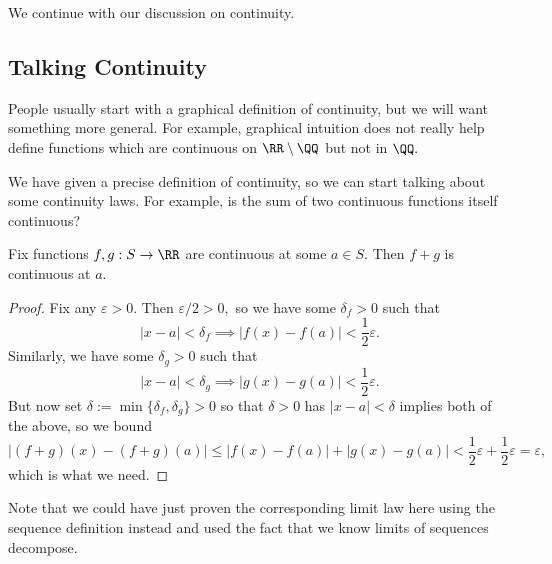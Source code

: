 \documentclass[../notes.tex]{subfiles}
\begin{document}

















We continue with our discussion on continuity.

\subsection{Talking Continuity}
People usually start with a graphical definition of continuity, but we will want something more general. For example, graphical intuition does not really help define functions which are continuous on $\RR\setminus\QQ$ but not in $\QQ.$

We have given a precise definition of continuity, so we can start talking about some continuity laws. For example, is the sum of two continuous functions itself continuous?
\begin{proposition}
	Fix functions $f,g:S\to\RR$ are continuous at some $a\in S.$ Then $f+g$ is continuous at $a.$
\end{proposition}
\begin{proof}
	Fix any $\varepsilon>0.$ Then $\varepsilon/2>0,$ so we have some $\delta_f>0$ such that
	\[|x-a|<\delta_f\implies|f(x)-f(a)|<\frac12\varepsilon.\]
	Similarly, we have some $\delta_g>0$ such that
	\[|x-a|<\delta_g\implies|g(x)-g(a)|<\frac12\varepsilon.\]
	But now set $\delta:=\min\{\delta_f,\delta_g\}>0$ so that $\delta>0$ has $|x-a|<\delta$ implies both of the above, so we bound
	\[|(f+g)(x)-(f+g)(a)|\le|f(x)-f(a)|+|g(x)-g(a)|<\frac12\varepsilon+\frac12\varepsilon=\varepsilon,\]
	which is what we need.
\end{proof}
Note that we could have just proven the corresponding limit law here using the sequence definition instead and used the fact that we know limits of sequences decompose.
\end{document}
